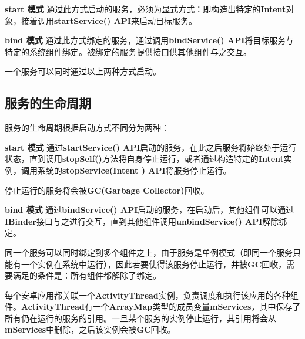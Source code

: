 \textbf{start 模式 } 通过此方式启动的服务，必须为显式方式：即构造出特定的\textbf{Intent}对象，接着调用\textbf{startService() API}来启动目标服务。

\textbf{bind 模式 } 通过此方式绑定的服务，通过调用\textbf{bindService() API}将目标服务与特定的系统组件绑定。被绑定的服务提供接口供其他组件与之交互。

一个服务可以同时通过以上两种方式启动。

\subsection{服务的生命周期}
服务的生命周期根据启动方式不同分为两种\cite{service}：

\textbf{start 模式 } 通过\textbf{startService() API}启动的服务，在此之后服务将始终处于运行状态，直到调用\textbf{stopSelf()}方法将自身停止运行，或者通过构造特定的\textbf{Intent}实例，调用系统的\textbf{stopService(Intent ) API}将服务停止运行。

停止运行的服务将会被\textbf{GC(Garbage Collector)}回收。

\textbf{bind 模式 } 通过\textbf{bindService() API}启动的服务，在启动后，其他组件可以通过\textbf{IBinder}接口与之进行交互，直到其他组件调用\textbf{unbindService() API}解除绑定。

同一个服务可以同时绑定到多个组件之上，由于服务是单例模式（即同一个服务只能有一个实例在系统中运行），因此若要使得该服务停止运行，并被\textbf{GC}回收，需要满足的条件是：所有组件都解除了绑定。

每个安卓应用都关联一个\textbf{ActivityThread}实例，负责调度和执行该应用的各种组件。\textbf{ActivityThread}有一个\textbf{ArrayMap}类型的成员变量\textbf{mServices}，其中保存了所有仍在运行的服务的引用。一旦某个服务的实例停止运行，其引用将会从\textbf{mServices}中删除，之后该实例会被\textbf{GC}回收。


